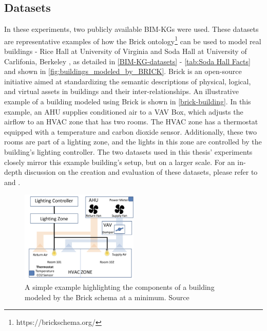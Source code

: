 \subsection{Datasets}
\label{subsec:experimental_datasets}
In these experiments, two publicly available \acp{BIM-KG} were used. These datasets are representative examples of how the Brick ontology\footnote{https://brickschema.org/} can be used to model real buildings - Rice Hall at University of Virginia \citep{Balaji2016Brick:Buildings} and Soda Hall at University of Carlifonia, Berkeley \citep{Balaji2016Brick:Buildings}, as detailed in \autoref{BIM-KG-datasets} - \autoref{tab:Soda Hall Facts} and shown in \autoref{fig:buildings_modeled_by_BRICK}. Brick is an open-source initiative aimed at standardizing the semantic descriptions of physical, logical, and virtual assets in buildings and their inter-relationships. An illustrative example of a building modeled using Brick is shown in \autoref{brick-building}. In this example, an \ac{AHU} supplies conditioned air to a \ac{VAV} Box, which adjusts the airflow to an \ac{HVAC} zone that has two rooms. The \ac{HVAC} zone has a thermostat equipped with a temperature and carbon dioxide sensor. Additionally, these two rooms are part of a lighting zone, and the lights in this zone are controlled by the building's lighting controller. The two datasets used in this thesis' experiments closely mirror this example building's setup, but on a larger scale. For an in-depth discussion on the creation and evaluation of these datasets, please refer to \cite{Balaji2016Brick:Buildings} and \cite{Balaji2018BrickApplications}.

\begin{figure}[t]
        \centering      \includegraphics[width=0.5\textwidth]{figures/brick-building.png}
        \caption{A simple example highlighting the components of a building modeled by the Brick schema at a minimum. Source \citep{Balaji2016Brick:Buildings}} \label{brick-building}
\end{figure}

